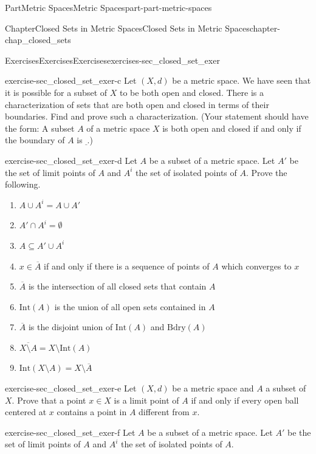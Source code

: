 \documentclass[oneside,10pt,]{book}
\numberwithin{equation}{chapter}
\newcommand{\Int}{\text{Int}}
\newcommand{\Bdry}{\text{Bdry}}
\begin{document}
\begin{partptx}{Part}{Metric Spaces}{}{Metric Spaces}{}{}{part-part-metric-spaces}
\begin{chapterptx}{Chapter}{Closed Sets in Metric Spaces}{}{Closed Sets in Metric Spaces}{}{}{chapter-chap_closed_sets}
\begin{exercises-section}{Exercises}{Exercises}{}{Exercises}{}{}{exercises-sec_closed_set_exer}
\begin{divisionexercise}{3}{}{}{exercise-sec_closed_set_exer-c}
Let \((X,d)\) be a metric space. We have seen that it is possible for a subset of \(X\) to be both open and closed. There is a characterization of sets that are both open and closed in terms of their boundaries. Find and prove such a characterization. (Your statement should have the form: A subset \(A\) of a metric space \(X\) is both open and closed if and only if the boundary of \(A\) is \(\underline{}\).)%
\end{divisionexercise}%
\begin{divisionexercise}{4}{}{}{exercise-sec_closed_set_exer-d}%
Let \(A\) be a subset of a metric space. Let \(A'\) be the set of limit points of \(A\) and \(A^i\) the set of isolated points of \(A\). Prove the following.%
\begin{enumerate}[font=\bfseries,label=(\alph*),ref=\alph*]%
\item{}\(A \cup A^i = A \cup A'\)%
\item{}\(A' \cap A^i = \emptyset\)%
\item{}\(A \subseteq A' \cup A^i\)%
\item{}\(x \in \overline{A}\) if and only if there is a sequence of points of \(A\) which converges to \(x\)%
\item{}\(\overline{A}\) is the intersection of all closed sets that contain \(A\)%
\item{}\(\Int(A)\) is the union of all open sets contained in \(A\)%
\item{}\(\overline{A}\) is the disjoint union of \(\Int(A)\) and \(\Bdry(A)\)%
\item{}\(\overline{X \setminus A} = X \setminus \Int(A)\)%
\item{}\(\Int(X \setminus A) = X \setminus \overline{A}\)%
\end{enumerate}%
\end{divisionexercise}%
\begin{divisionexercise}{5}{}{}{exercise-sec_closed_set_exer-e}%
Let \((X,d)\) be a metric space and \(A\) a subset of \(X\). Prove that a point \(x \in X\) is a limit point of \(A\) if and only if every open ball centered at \(x\) contains a point in \(A\) different from \(x\).%
\end{divisionexercise}%
\begin{divisionexercise}{6}{}{}{exercise-sec_closed_set_exer-f}%
Let \(A\) be a subset of a metric space. Let \(A'\) be the set of limit points of \(A\) and \(A^i\) the set of isolated points of \(A\).%
\begin{enumerate}[font=\bfseries,label=(\alph*),ref=\alph*]%

\end{enumerate}
\end{divisionexercise}
\end{exercises-section}
\end{chapterptx}
\end{partptx}
\end{document}
